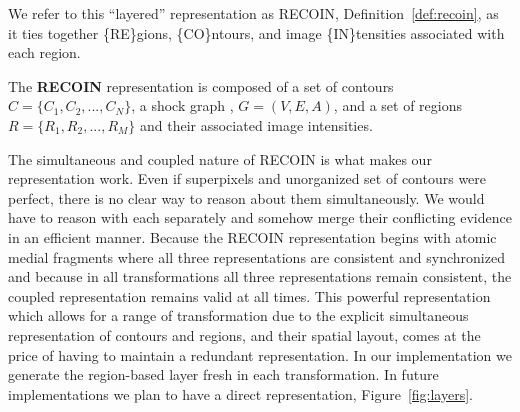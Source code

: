 We refer to this ``layered'' representation as RECOIN, Definition~\ref{def:recoin}, as it ties together \{RE\}gions, \{CO\}ntours, and image \{IN\}tensities associated with each region.

\begin{definition}
The {\bf RECOIN} representation is composed of a set of contours $C=\{C_1,C_2,...,C_N\}$, a shock graph , $G=(V,E,A)$, and a set of regions $R=\{R_1,R_2,...,R_M\}$ and their associated image intensities. 
\label{def:recoin}  
\end{definition}

The simultaneous and coupled nature of RECOIN is what makes our representation work. Even if superpixels and unorganized set of contours were perfect, there is no clear way to reason about them simultaneously. We would have to reason with each separately and somehow merge their conflicting evidence in an efficient manner. Because the RECOIN representation begins with atomic medial fragments where all three representations are consistent and synchronized and because in all transformations all three representations remain consistent, the coupled representation remains valid at all times. This powerful representation which allows for a range of transformation due to the explicit simultaneous representation of contours and regions, and their spatial layout, comes at the price of having to maintain a redundant representation. In our implementation we generate the region-based layer fresh in each transformation. In future implementations we plan to have a direct representation, Figure~\ref{fig:layers}.  



